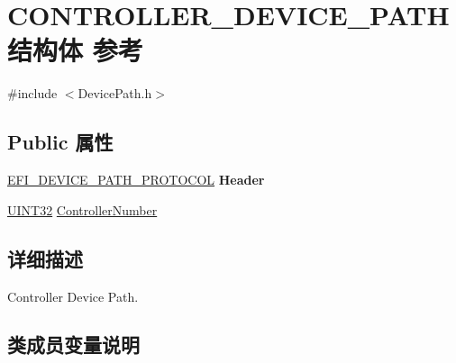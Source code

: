 \hypertarget{struct_c_o_n_t_r_o_l_l_e_r___d_e_v_i_c_e___p_a_t_h}{}\section{C\+O\+N\+T\+R\+O\+L\+L\+E\+R\+\_\+\+D\+E\+V\+I\+C\+E\+\_\+\+P\+A\+T\+H结构体 参考}
\label{struct_c_o_n_t_r_o_l_l_e_r___d_e_v_i_c_e___p_a_t_h}


{\ttfamily \#include $<$Device\+Path.\+h$>$}

\subsection*{Public 属性}
\begin{DoxyCompactItemize}
\item 
\mbox{\label{struct_c_o_n_t_r_o_l_l_e_r___d_e_v_i_c_e___p_a_t_h_afbc230fc53a93a190f52505fcbba4864}} 
\hyperlink{struct_e_f_i___d_e_v_i_c_e___p_a_t_h___p_r_o_t_o_c_o_l}{E\+F\+I\+\_\+\+D\+E\+V\+I\+C\+E\+\_\+\+P\+A\+T\+H\+\_\+\+P\+R\+O\+T\+O\+C\+OL} {\bfseries Header}
\item 
\hyperlink{_processor_bind_8h_ae1e6edbbc26d6fbc71a90190d0266018}{U\+I\+N\+T32} \hyperlink{struct_c_o_n_t_r_o_l_l_e_r___d_e_v_i_c_e___p_a_t_h_a3cb11e7e9e45c92c2940a49e221df393}{Controller\+Number}
\end{DoxyCompactItemize}


\subsection{详细描述}
Controller Device Path. 

\subsection{类成员变量说明}
\mbox{\label{struct_c_o_n_t_r_o_l_l_e_r___d_e_v_i_c_e___p_a_t_h_a3cb11e7e9e45c92c2940a49e221df393}} 
